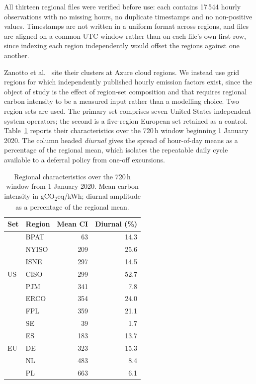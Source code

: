 All thirteen regional files were verified before use: each contains 17\,544
hourly observations with no missing hours, no duplicate timestamps and no
non-positive values. Timestamps are not written in a uniform format across
regions, and files are aligned on a common UTC window rather than on each
file's own first row, since indexing each region independently would offset
the regions against one another.

Zanotto et al.~\cite{zanotto2025usercentric} site their clusters at Azure cloud regions. We instead use grid
regions for which independently published hourly emission factors exist, since
the object of study is the effect of region-set composition and that requires
regional carbon intensity to be a measured input rather than a modelling
choice. Two region sets are used. The primary set comprises seven United States
independent system operators; the second is a five-region European set retained
as a control. Table~\ref{tab:regions} reports their characteristics over the
720\,h window beginning 1 January 2020. The column headed \emph{diurnal} gives
the spread of hour-of-day means as a percentage of the regional mean, which
isolates the repeatable daily cycle available to a deferral policy from
one-off excursions.

\begin{table}[t]
\centering
\caption{Regional characteristics over the 720\,h window from 1 January 2020.
Mean carbon intensity in gCO\textsubscript{2}eq/kWh; diurnal amplitude as a
percentage of the regional mean.}
\label{tab:regions}
\begin{tabular}{llrr}
\toprule
Set & Region & Mean CI & Diurnal (\%) \\
\midrule
\multirow{7}{*}{US}
 & BPAT  &  63 & 14.3 \\
 & NYISO & 209 & 25.6 \\
 & ISNE  & 297 & 14.5 \\
 & CISO  & 299 & 52.7 \\
 & PJM   & 341 &  7.8 \\
 & ERCO  & 354 & 24.0 \\
 & FPL   & 359 & 21.1 \\
\midrule
\multirow{5}{*}{EU}
 & SE & 39 &  1.7 \\
 & ES & 183 & 13.7 \\
 & DE & 323 & 15.3 \\
 & NL & 483 &  8.4 \\
 & PL & 663 &  6.1 \\
\bottomrule
\end{tabular}
\end{table}

